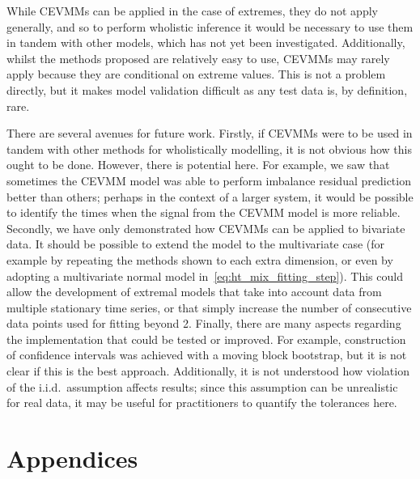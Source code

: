 \documentclass[11pt,twoside,openany]{book}
\numberwithin{Theorem}{chapter}
\numberwithin{Definition}{chapter}
\numberwithin{Lemma}{chapter}
\numberwithin{Algorithm}{chapter}
\numberwithin{equation}{chapter}
\begin{document}
While CEVMMs can be applied in the case of extremes, they
do not apply generally, and so to perform wholistic inference
it would be necessary to use them in tandem with other models,
which has not yet been investigated.
Additionally, whilst the methods proposed are relatively easy
to use, CEVMMs may rarely apply because they
are conditional on extreme values. This is not a problem directly,
but it makes model validation difficult as any test data is, by definition,
rare.



There are several avenues for future work. Firstly, if CEVMMs were to be used
in tandem with other methods for wholistically modelling,
it is not obvious how this ought to be done. However, there is potential here.
For example, we saw that sometimes the CEVMM model was able to perform imbalance
residual prediction better than others; perhaps in the context of a larger
system, it would be possible to identify the times when the signal from the
CEVMM model is more reliable. Secondly, we have only demonstrated how CEVMMs
can be applied to bivariate data. It should be possible to extend the model to
the multivariate case (for example by repeating the methods shown to each extra
dimension, or even by adopting a multivariate normal model
in~\eqref{eq:ht_mix_fitting_step}). This could allow the development of
extremal models that take into account data from multiple stationary time
series, or that simply increase the number of consecutive data points used for
fitting beyond 2. Finally, there are many aspects regarding the implementation
that could be tested or improved. For example, construction of confidence
intervals was achieved with a moving block bootstrap, but it is not clear if
this is the best approach. Additionally, it is not understood how violation of
the i.i.d.\ assumption affects results; since this assumption can be
unrealistic for real data, it may be useful for practitioners to quantify the
tolerances here.






\appendix
\chapter{Appendices}
\end{document}
